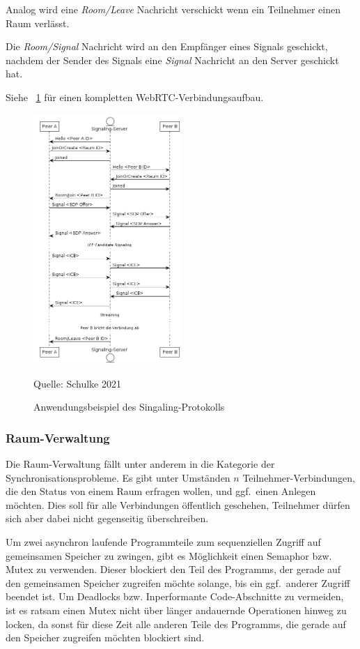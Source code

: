 \documentclass{article}
\newcommand{\figuresource}[1]{
	\begin{center}Quelle: #1\end{center}
}
\begin{document}
\begin{onecolumn}
Analog wird eine \textit{Room/Leave} Nachricht verschickt wenn ein Teilnehmer
einen Raum verlässt.

Die \textit{Room/Signal} Nachricht wird an den Empfänger eines Signals
geschickt, nachdem der Sender des Signals eine \textit{Signal} Nachricht an den
Server geschickt hat.

Siehe \figurename~\ref{fig:signaling-protocol-flow} für einen kompletten
WebRTC-Verbindungsaufbau.

\begin{figure}[ht]
	\includegraphics[width=0.5\textwidth]{signaling-protocol}
	\centering
	\caption{Anwendungsbeispiel des Singaling-Protokolls}\label{fig:signaling-protocol-flow}
	\figuresource{Schulke 2021}
\end{figure}

\subsubsection{Raum-Verwaltung}

Die Raum-Verwaltung fällt unter anderem in die Kategorie der
Synchronisationsprobleme. Es gibt unter Umständen $n$ Teilnehmer-Verbindungen,
die den Status von einem Raum erfragen wollen, und ggf.\ einen Anlegen möchten.
Dies soll für alle Verbindungen öffentlich geschehen, Teilnehmer dürfen sich
aber dabei nicht gegenseitig überschreiben.

Um zwei asynchron laufende Programmteile zum sequenziellen Zugriff auf
gemeinsamen Speicher zu zwingen, gibt es Möglichkeit einen Semaphor bzw. Mutex
zu verwenden. Dieser blockiert den Teil des Programms, der gerade auf den
gemeinsamen Speicher zugreifen möchte solange, bis ein ggf.\ anderer Zugriff
beendet ist. Um Deadlocks bzw. Inperformante Code-Abschnitte zu vermeiden, ist
es ratsam einen Mutex nicht über länger andauernde Operationen hinweg zu
locken, da sonst für diese Zeit alle anderen Teile des Programms, die gerade
auf den Speicher zugreifen möchten blockiert sind.


\end{onecolumn}
\end{document}
